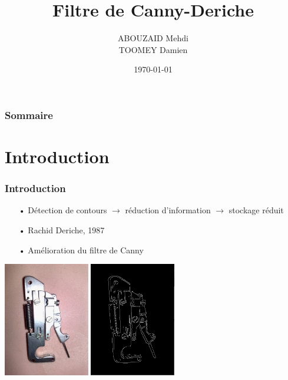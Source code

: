\documentclass{beamer}
\title{Filtre de Canny-Deriche}
\author[AM \--- TD]{ABOUZAID Mehdi \\ TOOMEY Damien}
\institute[INSA Rouen]{INSA \--- Institut National des Sciences Appliquées de Rouen}
\date{\today}
\newif\ifplacelogo %
\begin{document}
\begin{frame}
\titlepage
\end{frame}

\placelogofalse
\begin{frame}
\frametitle{Sommaire} 
\tableofcontents
\end{frame}	

\section{Introduction}
\begin{frame}
\frametitle{Introduction} 
\begin{itemize}
	\item[•] Détection de contours $\rightarrow$ réduction d'information $\rightarrow$ stockage réduit
	\item[•] Rachid Deriche, 1987
	\item[•] Amélioration du filtre de Canny
\end{itemize}

\centerline{\includegraphics[height=5cm]{Images/intro_originale} \hspace{0.5cm} \includegraphics[height=5cm]{Images/intro_filtree}}

\end{frame}	
\end{document}
